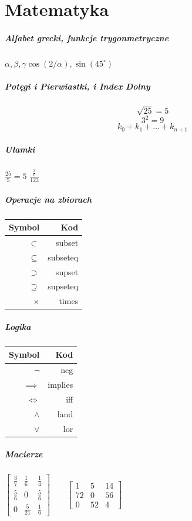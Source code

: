 \documentclass[a4paper]{article}
\begin{document}
\section{Matematyka}
\subparagraph{Alfabet grecki, funkcje trygonmetryczne}
\begin{math}
\alpha, \beta,  \gamma
\cos (2/\alpha), \sin (45^\circ )
\end{math}
\subparagraph{Potęgi i Pierwiastki, i Index Dolny}

$$ \sqrt{25} = 5 $$
$$ 3^2 = 9 $$
$$ k_0 + k_1 + ... + k_{n+1} $$ %

\subparagraph{Ułamki}
$ \frac{25}{5} = 5 $ \newline
$ \frac{\frac{3}{6}}{123} $
\subparagraph{Operacje na zbiorach}
\begin{tabular}{| r | r |}
\hline
Symbol & Kod \\
\hline
$ \subset $ & subset \\
\hline
$ \subseteq $ & subseteq \\
\hline
$ \supset $ & supset \\
\hline
$ \supseteq $ & supseteq \\
\hline 
$ \times $ & times \\
\hline
\end{tabular}
\subparagraph{Logika}
\begin{tabular}{|r|r|}
\hline
Symbol & Kod \\
\hline
$ \neg $ & neg \\ %
\hline
$ \implies $ & implies \\ %
\hline
$ \iff $ & iff \\ %
\hline
$ \land $ & land \\	%
\hline 
$ \lor $ & lor \\ %
\hline
\end{tabular}
\subparagraph{Macierze}
\begin{math}
\begin{bmatrix}
       \frac{3}{7} & \frac{1}{6} & \frac{1}{4} \\[0.3em]
       \frac{5}{6} & 0           & \frac{5}{6} \\[0.3em]     
       0           & \frac{5}{21} & \frac{1}{6}
     \end{bmatrix} 
           \qquad %
           \begin{bmatrix}
       1 & 5 & 14 \\[0.3em]
      72 & 0  & 56 \\[0.3em]     
       0 & 52 & 4
     \end{bmatrix} 
\end{math}
\end{document}
